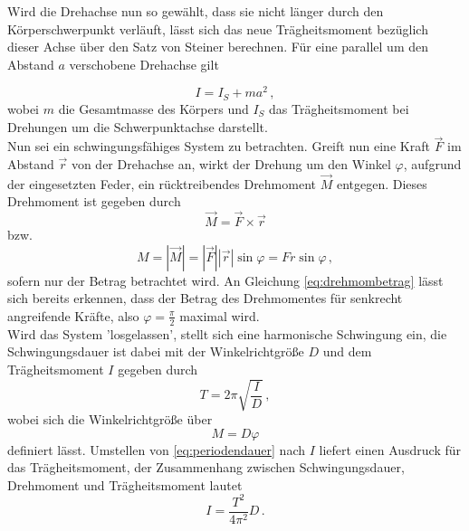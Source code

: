 Wird die Drehachse nun so gewählt, dass sie nicht länger durch den Körperschwerpunkt verläuft, lässt sich das neue Trägheitsmoment bezüglich dieser Achse über den Satz von Steiner berechnen.
Für eine parallel um den Abstand $a$ verschobene Drehachse gilt

\begin{equation}
    I = I_S + ma^2\,,
    \label{eq:steiner}
\end{equation}
wobei $m$ die Gesamtmasse des Körpers und $I_S$ das Trägheitsmoment bei Drehungen um die Schwerpunktachse darstellt. \\

Nun sei ein schwingungsfähiges System zu betrachten. Greift nun eine Kraft $\vec{F}$ im Abstand $\vec{r}$ von der Drehachse an, wirkt der Drehung um den Winkel $\varphi$, aufgrund der eingesetzten Feder,
ein rücktreibendes Drehmoment $\vec{M}$ entgegen. 
Dieses Drehmoment ist gegeben durch
\begin{equation*}
    \vec{M} = \vec{F} \times \vec{r}
\end{equation*}
bzw.
\begin{equation}
    M = |\vec{M}| = |\vec{F}||\vec{r}| \sin\varphi = F r \sin\varphi\,,
    \label{eq:drehmombetrag}
\end{equation}
sofern nur der Betrag betrachtet wird.
An Gleichung \eqref{eq:drehmombetrag} lässt sich bereits erkennen, dass der Betrag des Drehmomentes für senkrecht angreifende Kräfte, also $\varphi=\frac{π}{2}$ maximal wird. \\

Wird das System 'losgelassen', stellt sich eine harmonische Schwingung ein, die Schwingungsdauer ist dabei mit der Winkelrichtgröße $D$ und dem Trägheitsmoment $I$ gegeben durch
\begin{equation}
    T = 2 π \sqrt{\frac{I}{D}}\,,
    \label{eq:periodendauer}
\end{equation}
wobei sich die Winkelrichtgröße über
\begin{equation}
    M = D \varphi
    \label{eq:winkelrichtgröße}
\end{equation}
definiert lässt. 
Umstellen von \eqref{eq:periodendauer} nach $I$ liefert einen Ausdruck für das Trägheitsmoment, der Zusammenhang zwischen Schwingungsdauer, Drehmoment und Trägheitsmoment lautet
\begin{equation}
    I = \frac{T^2}{4 π^2} D \,.
    \label{eq:trägüschwi}
\end{equation}\\


